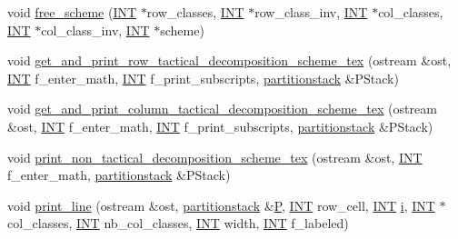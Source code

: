 \begin{DoxyCompactItemize}
\item 
void \mbox{\hyperlink{classincidence__structure_ace4567a2b4174d77f15e8a52fb72b1e3}{free\+\_\+scheme}} (\mbox{\hyperlink{galois_8h_a09fddde158a3a20bd2dcadb609de11dc}{I\+NT}} $\ast$row\+\_\+classes, \mbox{\hyperlink{galois_8h_a09fddde158a3a20bd2dcadb609de11dc}{I\+NT}} $\ast$row\+\_\+class\+\_\+inv, \mbox{\hyperlink{galois_8h_a09fddde158a3a20bd2dcadb609de11dc}{I\+NT}} $\ast$col\+\_\+classes, \mbox{\hyperlink{galois_8h_a09fddde158a3a20bd2dcadb609de11dc}{I\+NT}} $\ast$col\+\_\+class\+\_\+inv, \mbox{\hyperlink{galois_8h_a09fddde158a3a20bd2dcadb609de11dc}{I\+NT}} $\ast$scheme)
\item 
void \mbox{\hyperlink{classincidence__structure_a93bcc4c9c4ebb9635a60b2c5df9c43b0}{get\+\_\+and\+\_\+print\+\_\+row\+\_\+tactical\+\_\+decomposition\+\_\+scheme\+\_\+tex}} (ostream \&ost, \mbox{\hyperlink{galois_8h_a09fddde158a3a20bd2dcadb609de11dc}{I\+NT}} f\+\_\+enter\+\_\+math, \mbox{\hyperlink{galois_8h_a09fddde158a3a20bd2dcadb609de11dc}{I\+NT}} f\+\_\+print\+\_\+subscripts, \mbox{\hyperlink{classpartitionstack}{partitionstack}} \&P\+Stack)
\item 
void \mbox{\hyperlink{classincidence__structure_a579c0686f4e480a4239e7a00c80f665f}{get\+\_\+and\+\_\+print\+\_\+column\+\_\+tactical\+\_\+decomposition\+\_\+scheme\+\_\+tex}} (ostream \&ost, \mbox{\hyperlink{galois_8h_a09fddde158a3a20bd2dcadb609de11dc}{I\+NT}} f\+\_\+enter\+\_\+math, \mbox{\hyperlink{galois_8h_a09fddde158a3a20bd2dcadb609de11dc}{I\+NT}} f\+\_\+print\+\_\+subscripts, \mbox{\hyperlink{classpartitionstack}{partitionstack}} \&P\+Stack)
\item 
void \mbox{\hyperlink{classincidence__structure_a27995a1d72c680e66343d871d838800e}{print\+\_\+non\+\_\+tactical\+\_\+decomposition\+\_\+scheme\+\_\+tex}} (ostream \&ost, \mbox{\hyperlink{galois_8h_a09fddde158a3a20bd2dcadb609de11dc}{I\+NT}} f\+\_\+enter\+\_\+math, \mbox{\hyperlink{classpartitionstack}{partitionstack}} \&P\+Stack)
\item 
void \mbox{\hyperlink{classincidence__structure_ae76fdf2cf39ba776ed86b0b910d7746a}{print\+\_\+line}} (ostream \&ost, \mbox{\hyperlink{classpartitionstack}{partitionstack}} \&\mbox{\hyperlink{simeon_8_c_a7fa15551e800919e93401fbbcd8e71e8}{P}}, \mbox{\hyperlink{galois_8h_a09fddde158a3a20bd2dcadb609de11dc}{I\+NT}} row\+\_\+cell, \mbox{\hyperlink{galois_8h_a09fddde158a3a20bd2dcadb609de11dc}{I\+NT}} \mbox{\hyperlink{alphabet2_8_c_acb559820d9ca11295b4500f179ef6392}{i}}, \mbox{\hyperlink{galois_8h_a09fddde158a3a20bd2dcadb609de11dc}{I\+NT}} $\ast$col\+\_\+classes, \mbox{\hyperlink{galois_8h_a09fddde158a3a20bd2dcadb609de11dc}{I\+NT}} nb\+\_\+col\+\_\+classes, \mbox{\hyperlink{galois_8h_a09fddde158a3a20bd2dcadb609de11dc}{I\+NT}} width, \mbox{\hyperlink{galois_8h_a09fddde158a3a20bd2dcadb609de11dc}{I\+NT}} f\+\_\+labeled)

\end{DoxyCompactItemize}
